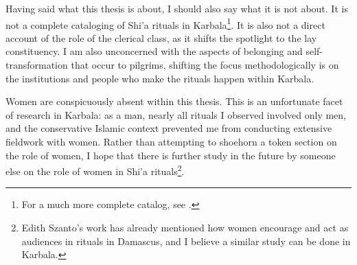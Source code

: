 
Having said what this thesis is about, I should also say what it is not about. It is not a complete cataloging of Shi'a rituals in Karbala\footnote{For a much more complete catalog, see \cite{hamdan_development_2012}.}. It is also not a direct account of the role of the clerical class, as it shifts the spotlight to the lay constituency. I am also unconcerned with the aspects of belonging and self-transformation that occur to pilgrims, shifting the focus methodologically is on the institutions and people who make the rituals happen within Karbala.

Women are conspicuously absent within this thesis. This is an unfortunate facet of research in Karbala: as a man, nearly all rituals I observed involved only men, and the conservative Islamic context prevented me from conducting extensive fieldwork with women. Rather than attempting to shoehorn a token section on the role of women, I hope that there is further study in the future by someone else on the role of women in Shi'a rituals\footnote{Edith Szanto's work\cite{szanto_beyond_2013} has already mentioned how women encourage and act as audiences in rituals in Damascus, and I believe a similar study can be done in Karbala.}. 



